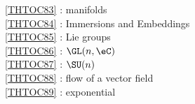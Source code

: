 \ref {THTOC83} : manifolds\\
\ref {THTOC84} : Immersions and Embeddings\\
\ref {THTOC85} : Lie groups\\
\ref {THTOC86} : \( \GL (n,\eC )\)\\
\ref {THTOC87} : \( \SU (n)\)\\
\ref {THTOC88} : flow of a vector field\\
\ref {THTOC89} : exponential\\
